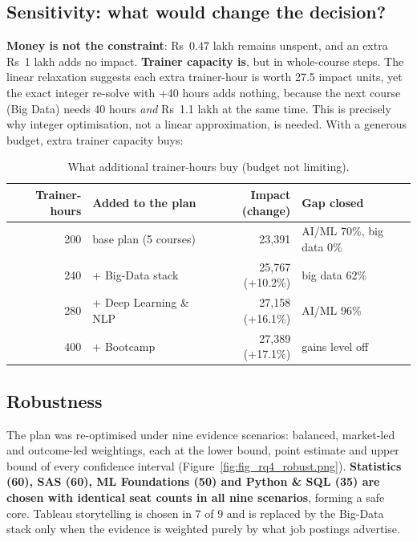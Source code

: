 \subsection{Sensitivity: what would change the decision?}

\textbf{Money is not the constraint}: Rs~0.47 lakh remains unspent, and an extra Rs~1 lakh adds no
impact. \textbf{Trainer capacity is}, but in whole-course steps. The linear relaxation suggests each
extra trainer-hour is worth 27.5 impact units, yet the exact integer re-solve with +40 hours adds
nothing, because the next course (Big Data) needs 40 hours \emph{and} Rs~1.1 lakh at the same time.
This is precisely why integer optimisation, not a linear approximation, is needed. With a generous
budget, extra trainer capacity buys:

\begin{table}[H]\centering\small
\caption{What additional trainer-hours buy (budget not limiting).}\label{tab:hours}
\begin{tabular}{@{}r l r l@{}}
\toprule
Trainer-hours & Added to the plan & Impact (change) & Gap closed\\
\midrule
200 & base plan (5 courses) & 23,391 & AI/ML 70\%, big data 0\%\\
240 & + Big-Data stack & 25,767 (+10.2\%) & big data 62\%\\
280 & + Deep Learning \& NLP & 27,158 (+16.1\%) & AI/ML 96\%\\
400 & + Bootcamp & 27,389 (+17.1\%) & gains level off\\
\bottomrule
\end{tabular}
\end{table}


\subsection{Robustness}

The plan was re-optimised under nine evidence scenarios: balanced, market-led and outcome-led
weightings, each at the lower bound, point estimate and upper bound of every confidence interval
(Figure~\ref{fig:fig_rq4_robust.png}). \textbf{Statistics (60), SAS (60), ML Foundations (50) and
Python \& SQL (35) are chosen with identical seat counts in all nine scenarios}, forming a safe core.
Tableau storytelling is chosen in 7 of 9 and is replaced by the Big-Data stack only when the
evidence is weighted purely by what job postings advertise.

